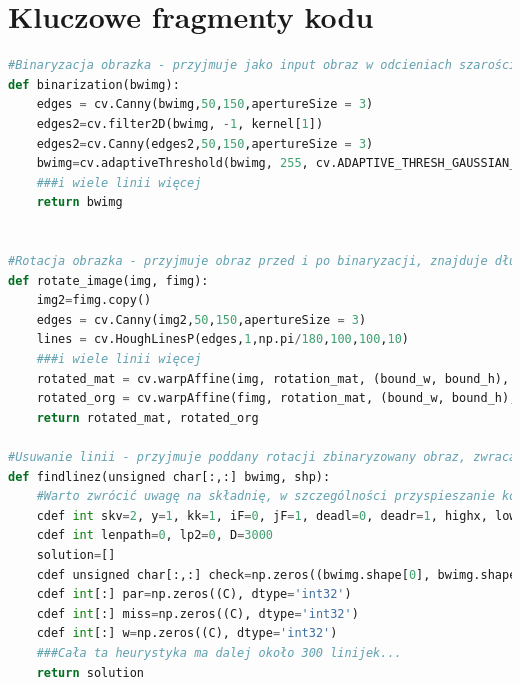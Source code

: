 \documentclass[12pt]{article}
\begin{document}
\section{Kluczowe fragmenty kodu}
\begin{lstlisting}[language=Python]
#Binaryzacja obrazka - przyjmuje jako input obraz w odcieniach szarości, zwraca obraz czarno biały z uwypuklonymi ciemniejszymi niż tło obszarami. Opiera się na kompletnym zaciemnieniu obszarów, wokół których kolor nigdy się nie zmienia i standardowej binaryzacji dla pozostałych obszarów obrazka
def binarization(bwimg):
	edges = cv.Canny(bwimg,50,150,apertureSize = 3)
	edges2=cv.filter2D(bwimg, -1, kernel[1])
	edges2=cv.Canny(edges2,50,150,apertureSize = 3)
	bwimg=cv.adaptiveThreshold(bwimg, 255, cv.ADAPTIVE_THRESH_GAUSSIAN_C, cv.THRESH_BINARY, Hypers['Binarization_conn'], 1)
	###i wiele linii więcej
	return bwimg
	

#Rotacja obrazka - przyjmuje obraz przed i po binaryzacji, znajduje długie linie na oryginalnym obrazku po czym dzeli je na klasy abstrakcji tak, że linie x, y są w 1 klasie abstrakcji, jeśli istnieje takie z, że z*0.01<=cos(x),cos(y)<z*0.01+0.01. W zależności od klasy abstrakcji o największej mocy zbioru ustawiam obrazek tak, aby jak najwięcej linii było poziomych. Zwraca Obrócone obrazy - oryginalny i zbinaryzowany
def rotate_image(img, fimg):
	img2=fimg.copy()
	edges = cv.Canny(img2,50,150,apertureSize = 3)
	lines = cv.HoughLinesP(edges,1,np.pi/180,100,100,10)
	###i wiele linii więcej
	rotated_mat = cv.warpAffine(img, rotation_mat, (bound_w, bound_h), borderValue=255)
	rotated_org = cv.warpAffine(fimg, rotation_mat, (bound_w, bound_h), borderValue=255)
	return rotated_mat, rotated_org
	
#Usuwanie linii - przyjmuje poddany rotacji zbinaryzowany obraz, zwraca zbinaryzowany obraz pozbawiony linii przez referencję, a także miejsca występowania pięciolinii. Kod opiera się na kilkudziesięciu heurystykach grafowych (obrazek jest traktowany jako graf, który można przejść algorytmem Breadth First Search zatrzymując algrytm po znalezieniu wszystkich linii poziomych). Algorytm celem skrócenia czasu jego wykonania został przeniesiony do Cythona
def findlinez(unsigned char[:,:] bwimg, shp):
	#Warto zwrócić uwagę na składnię, w szczególności przyspieszanie kodu za pomocą memoryviewa
	cdef int skv=2, y=1, kk=1, iF=0, jF=1, deadl=0, deadr=1, highx, lowx, x1, x2, C=140000, myconst=Hyperparameters['Upgrade']
	cdef int lenpath=0, lp2=0, D=3000
	solution=[]
	cdef unsigned char[:,:] check=np.zeros((bwimg.shape[0], bwimg.shape[1]), dtype='uint8')
	cdef int[:] par=np.zeros((C), dtype='int32')
	cdef int[:] miss=np.zeros((C), dtype='int32')
	cdef int[:] w=np.zeros((C), dtype='int32')
	###Cała ta heurystyka ma dalej około 300 linijek...
	return solution


\end{lstlisting}
\end{document}
